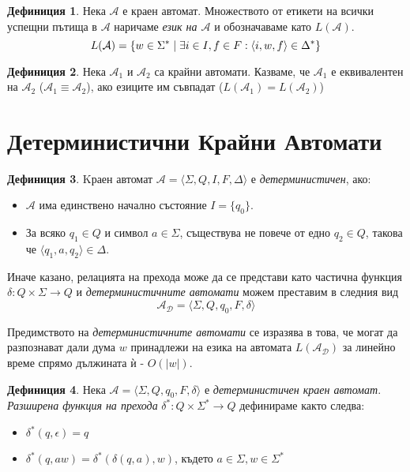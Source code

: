 \documentclass[11pt, oneside]{article}
\theoremstyle{definition}
\newtheorem{definition}{Дефиниция}[section]
\begin{document}
\begin{definition} 
	Нека \( \mathcal{A} \) е краен автомат. Множеството от етикети на всички успещни пътища в \( \mathcal{A} \) наричаме \emph{език на \( \mathcal{A} \)} и обозначаваме като \( L(\mathcal{A}) \). \[ L(\mathcal{A}) = \{ w \in \Sigma^* \hspace{0.1cm} | \hspace{0.1cm} \exists i \in I, f \in F : \langle i, w, f \rangle \in \Delta^* \} \]
\end{definition}

\begin{definition} 
	Нека \( \mathcal{A}_1 \) и \( \mathcal{A}_2 \) са крайни автомати. Казваме, че \( \mathcal{A}_1 \) е еквивалентен на \( \mathcal{A}_2 \) (\( \mathcal{A}_1 \equiv \mathcal{A}_2 \)), ако езиците им съвпадат (\( L(\mathcal{A}_1) = L(\mathcal{A}_2) \))
\end{definition}

\section{Детерминистични Крайни Автомати}

\begin{definition}
	Kраен автомат \( \mathcal{A} = \langle \Sigma, Q, I, F, \Delta \rangle \) е \emph{детерминистичен}, ако:

	\begin{itemize}
		\item \( \mathcal{A} \) има единствено начално състояние \(I = \{q_0\}\).
		\item За всяко \( q_1 \in Q \) и символ \( a \in \Sigma \), съществува не повече от едно \( q_2 \in Q \), такова че \( \langle q_1, a, q_2 \rangle \in \Delta \).
	\end{itemize} 

	\noindent Иначе казано, релацията на прехода може да се представи като частична функция \( \delta: Q \times \Sigma \to Q \) и \emph{детерминистичните автомати} можем преставим в следния вид \[ \mathcal{A_D} = \langle \Sigma, Q, q_0, F, \delta \rangle \]

	Предимството на \emph{детерминистичните автомати} се изразява в това, че могат да разпознават дали дума \( w \) принадлежи на езика на автомата \( L(\mathcal{A_D}) \) за линейно време спрямо дължината ѝ - \( O(|w|) \).
\end{definition}

\begin{definition}
	Нека \( \mathcal{A} = \langle \Sigma, Q, q_0, F, \delta \rangle \) е \emph{детерминистичен краен автомат}. \emph{Разширена функция на прехода} \( \delta^*: Q \times \Sigma^* \to Q \) дефинираме както следва:

	\begin{itemize}
		\item \( \delta^*(q, \epsilon) = q \)
		\item \( \delta^*(q, aw) = \delta^*(\delta(q, a), w) \), където \( a \in \Sigma, w \in \Sigma^* \)
	\end{itemize}
\end{definition}
\end{document}
